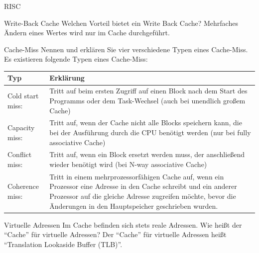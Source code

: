 \begin{defi}[Befehlssatzarchitektur]{RISC}
    \begin{aufgabe}[Caches]{Write-Back Cache}
        Welchen Vorteil bietet ein Write Back Cache?
        \tcblower
        Mehrfaches Ändern eines Wertes wird nur im Cache durchgeführt.
    \end{aufgabe}

    \begin{aufgabe}[Cache]{Cache-Miss}
        Nennen und erklären Sie vier verschiedene Typen eines Cache-Miss.
        \tcblower
        Es existieren folgende Typen eines Cache-Miss:\\
        \begin{tabularx}{\textwidth}{|l|X|}
            \toprule
            Typ              & Erklärung                                                                                                                                          \\
            \midrule
            Cold start miss: & Tritt auf beim ersten Zugriff auf einen Block nach dem Start des Programms oder dem Task-Wechsel (auch bei unendlich großem Cache)                 \\
            \midrule
            Capacity miss:   & Tritt auf, wenn der Cache nicht alle Blocks speichern kann, die bei der Ausführung durch die CPU benötigt werden (nur bei fully associative Cache) \\
            \midrule
            Conflict miss:   & Tritt auf, wenn ein Block ersetzt werden muss, der anschließend wieder benötigt wird (bei N-way associative Cache)                                 \\
            \midrule
            Coherence miss: & Tritt in einem mehrprozessorfähigen Cache auf,
            wenn ein Prozessor eine Adresse in den Cache schreibt und ein anderer Prozessor auf die gleiche Adresse zugreifen möchte,
            bevor die Änderungen in den Hauptspeicher geschrieben wurden. \\
            \bottomrule
        \end{tabularx}
    \end{aufgabe}

    \begin{aufgabe}[Cache]{Virtuelle Adressen}
        Im Cache befinden sich stets reale Adressen.
        Wie heißt der \enquote{Cache} für virtuelle Adressen?
        \tcblower
        Der \enquote{Cache} für virtuelle Adressen heißt \enquote{Translation Lookaside Buffer (TLB)}.
    \end{aufgabe}


\end{defi}
